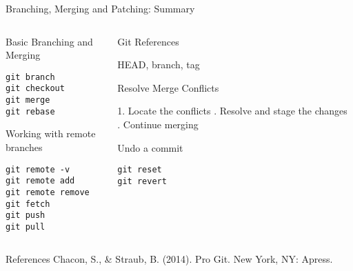 \begin{frame}[fragile]{Branching, Merging and Patching: Summary}
  \begin{columns}[t]
    \begin{column}{0.5\textwidth}
Basic Branching and Merging
      \begin{verbatim}
git branch 
git checkout 
git merge 
git rebase 
      \end{verbatim}
Working with remote branches
      \begin{verbatim}
git remote -v
git remote add
git remote remove
git fetch
git push
git pull
      \end{verbatim}
    \end{column}
    \begin{column}{0.5\textwidth}
      Git References
      \begin{flushleft}
        \footnotesize
HEAD, branch, tag
      \end{flushleft}
Resolve Merge Conflicts
      \begin{flushleft}
        \footnotesize
1. Locate the conflicts . Resolve and stage the changes . Continue merging
      \end{flushleft}
Undo a commit
      \begin{verbatim}
git reset
git revert
      \end{verbatim}
    \end{column}
  \end{columns}
  \begin{flushleft}
    \footnotesize
    References \break
    Chacon, S., \& Straub, B. (2014). Pro Git. New York, NY: Apress.
  \end{flushleft}
\end{frame}
